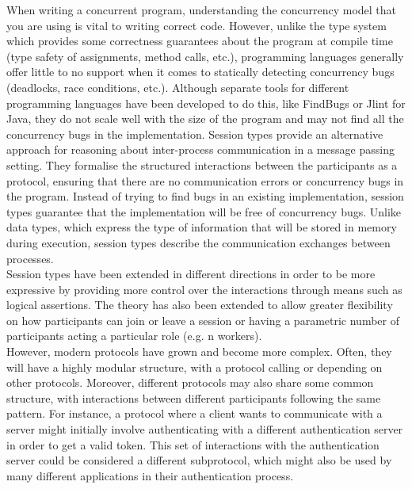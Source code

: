 \documentclass[12pt,twoside]{report}
\newcommand{\comment}[1]{}
\begin{document}
When writing a concurrent program, understanding the concurrency model that you are using is vital to writing correct code. However, unlike the type system which provides some correctness guarantees about the program at compile time (type safety of assignments, method calls, etc.), programming languages generally offer little to no support when it comes to statically detecting concurrency bugs (deadlocks, race conditions, etc.). Although separate tools for different programming languages have been developed to do this, like FindBugs\cite{FindBugs} or Jlint\cite{JLint} for Java\comment{How Good is Static Analysis at Finding Concurrency Bugs?/Find Bugs paper and chord paper}, they do not scale well with the size of the program and may not find all the concurrency bugs in the implementation\cite{ConcurrencyTools}. Session types\cite{binarysessiontypes1} provide an alternative approach for reasoning about inter-process communication in a message passing setting. They formalise the structured interactions between the participants as a protocol, ensuring that there are no communication errors or concurrency bugs in the program. Instead of trying to find bugs in an existing implementation, session types guarantee that the implementation will be free of concurrency bugs. Unlike data types, which express the type of information that will be stored in memory during execution, session types describe the communication exchanges between processes.\\

Session types have been extended in different directions in order to be more expressive by providing more control over the interactions through means such as logical assertions\cite{logicaassertions}. The theory has also been extended to allow greater flexibility on how participants can join or leave a session\cite{multirolesessiontypes} or having a parametric number of participants acting a particular role (e.g. n workers)\cite{parametrictypes}.\\

However, modern protocols have grown and become more complex. Often, they will have a highly modular structure, with a protocol calling or depending on other protocols. Moreover, different protocols may also share some common structure, with interactions between different participants following the same pattern. For instance, a protocol where a client wants to communicate with a server might initially involve authenticating with a different authentication server in order to get a valid token. This set of interactions with the authentication server could be considered a different subprotocol, which might also be used by many different applications in their authentication process. \\
\end{document}
